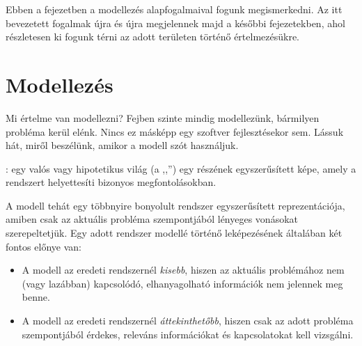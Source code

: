 
Ebben a fejezetben a modellezés alapfogalmaival fogunk megismerkedni. Az itt bevezetett fogalmak újra és újra megjelennek majd a későbbi fejezetekben, ahol részletesen ki fogunk térni az adott területen történő értelmezésükre.


\section{Modellezés}

Mi értelme van modellezni? Fejben szinte mindig modellezünk, bármilyen probléma kerül elénk. Nincs ez másképp egy szoftver fejlesztésekor sem. Lássuk hát, miről beszélünk, amikor a modell szót használjuk.

\begin{definicio}
	: egy valós vagy hipotetikus világ (a ,,'') egy részének egyszerűsített képe, amely a rendszert helyettesíti bizonyos megfontolásokban.
\end{definicio}

A modell tehát egy többnyire bonyolult rendszer egyszerűsített reprezentációja, amiben csak az aktuális probléma szempontjából lényeges vonásokat szerepeltetjük.
Egy adott rendszer modellé történő leképezésének általában két fontos előnye van: %

\begin{itemize}
	\item A modell az eredeti rendszernél \emph{kisebb}, hiszen az aktuális problémához nem (vagy lazábban) kapcsolódó, elhanyagolható információk nem jelennek meg benne.
	\item A modell az eredeti rendszernél \emph{áttekinthetőbb}, hiszen csak az adott probléma szempontjából érdekes, releváns információkat és kapcsolatokat kell vizsgálni.
\end{itemize}

